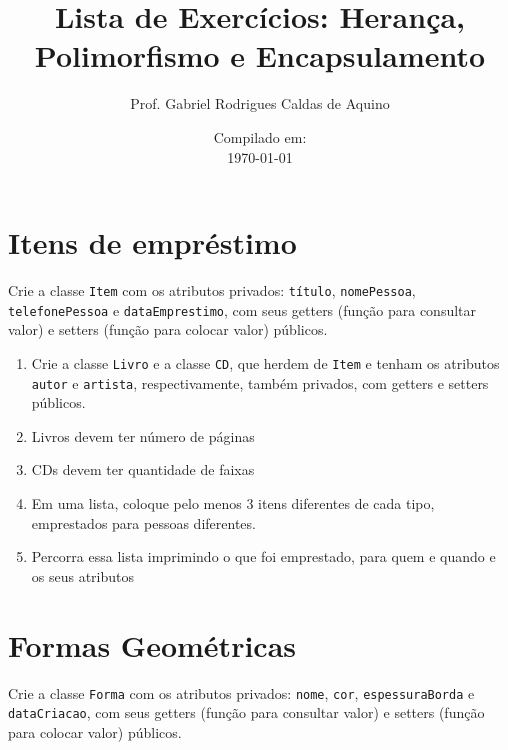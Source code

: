 \documentclass{article}
\title{Lista de Exercícios: Herança, Polimorfismo e Encapsulamento}
\author{Prof. Gabriel Rodrigues Caldas de Aquino}
\date{Compilado em: \\ \today}
\begin{document}
\maketitle

\section{Itens de empréstimo}
Crie a classe \texttt{Item} com os atributos privados: \texttt{título}, \texttt{nomePessoa}, \texttt{telefonePessoa} e
\texttt{dataEmprestimo}, com seus getters (função para consultar valor) e setters (função para colocar valor) públicos.

\begin{enumerate}
    \item Crie a classe \texttt{Livro} e a classe \texttt{CD}, que herdem de \texttt{Item} e tenham os atributos
          \texttt{autor} e \texttt{artista}, respectivamente, também privados, com getters e setters públicos.
    \item Livros devem ter número de páginas
    \item CDs devem ter quantidade de faixas
    \item Em uma lista, coloque pelo menos 3 itens diferentes de cada tipo, emprestados para pessoas diferentes.
    \item Percorra essa lista imprimindo o que foi emprestado, para quem e quando e os seus atributos



\end{enumerate}


\section{Formas Geométricas}
Crie a classe \texttt{Forma} com os atributos privados: \texttt{nome}, \texttt{cor}, \texttt{espessuraBorda} e
\texttt{dataCriacao}, com seus getters (função para consultar valor) e setters (função para colocar valor) públicos.
\end{document}
